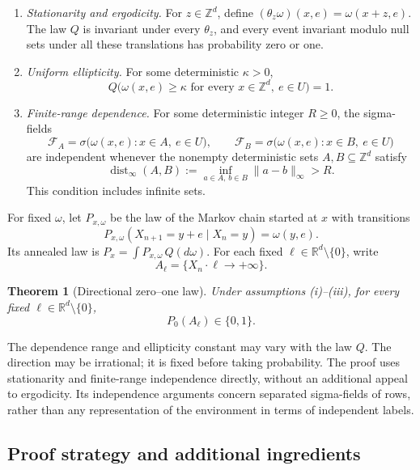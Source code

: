 \documentclass[11pt]{article}
\numberwithin{equation}{section}
\newtheorem{theorem}{Theorem}[section]
\theoremstyle{definition}
\theoremstyle{remark}
\newcommand{\RR}{\mathbb R}
\newcommand{\ZZ}{\mathbb Z}
\newcommand{\norm}[1]{\lVert #1\rVert}
\DeclareMathOperator{\dist}{dist}
\begin{document}
\begin{enumerate}[label=\textup{(\roman*)}]
\item \emph{Stationarity and ergodicity.}
For $z\in\ZZ^d$, define
$(\theta_z\omega)(x,e)=\omega(x+z,e)$. The law $Q$ is invariant under
every $\theta_z$, and every event invariant modulo null sets under all
these translations has probability zero or one.
\item \emph{Uniform ellipticity.}
For some deterministic $\kappa>0$,
\[
 Q\bigl(\omega(x,e)\ge\kappa
          \text{ for every }x\in\ZZ^d,\ e\in U\bigr)=1.
\]
\item \emph{Finite-range dependence.}
For some deterministic integer $R\ge0$, the sigma-fields
\[
 \mathcal F_A=\sigma\bigl(\omega(x,e):x\in A,\ e\in U\bigr),
 \qquad \mathcal F_B=\sigma\bigl(\omega(x,e):x\in B,\ e\in U\bigr)
\]
are independent whenever the nonempty deterministic sets
$A,B\subseteq\ZZ^d$ satisfy
\begin{equation}\label{eq:finite-range}
 \dist_\infty(A,B):=
 \inf_{a\in A,\,b\in B}\norm{a-b}_\infty>R.
\end{equation}
This condition includes infinite sets.
\end{enumerate}

For fixed $\omega$, let $P_{x,\omega}$ be the law of the Markov chain
started at $x$ with transitions
\[
 P_{x,\omega}(X_{n+1}=y+e\mid X_n=y)=\omega(y,e).
\]
Its annealed law is $P_x=\int P_{x,\omega}\,Q(d\omega)$.
For each fixed $\ell\in\RR^d\setminus\{0\}$, write
\[
 A_\ell=\{X_n\cdot\ell\longrightarrow+\infty\}.
\]

\begin{theorem}[Directional zero--one law]\label{thm:main}
Under assumptions \textup{(i)--(iii)}, for every fixed
$\ell\in\RR^d\setminus\{0\}$,
\[
 P_0(A_\ell)\in\{0,1\}.
\]
\end{theorem}

The dependence range and ellipticity constant may vary with the law $Q$.
The direction may be irrational; it is fixed before taking probability.
The proof uses stationarity and finite-range independence directly, without
an additional appeal to ergodicity. Its independence arguments concern
separated sigma-fields of rows, rather than any representation of the
environment in terms of independent labels.



\subsection{Proof strategy and additional ingredients}
\end{document}

